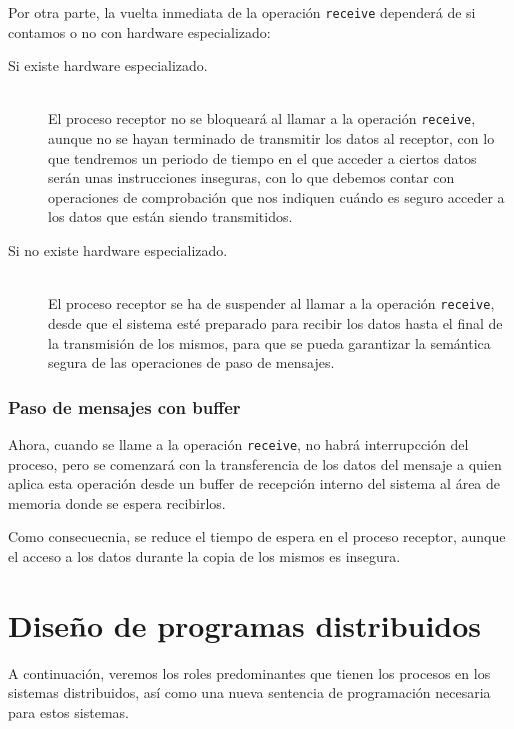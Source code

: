 Por otra parte, la vuelta inmediata de la operación \verb|receive| dependerá de si contamos o no con hardware especializado:
\begin{description}
    \item [Si existe hardware especializado.]~\\
        El proceso receptor no se bloqueará al llamar a la operación \verb|receive|, aunque no se hayan terminado de transmitir los datos al receptor, con lo que tendremos un periodo de tiempo en el que acceder a ciertos datos serán unas instrucciones inseguras, con lo que debemos contar con operaciones de comprobación que nos indiquen cuándo es seguro acceder a los datos que están siendo transmitidos.
    \item [Si no existe hardware especializado.]~\\
        El proceso receptor se ha de suspender al llamar a la operación \verb|receive|, desde que el sistema esté preparado para recibir los datos hasta el final de la transmisión de los mismos, para que se pueda garantizar la semántica segura de las operaciones de paso de mensajes.
\end{description}

\subsubsection{Paso de mensajes con buffer}
Ahora, cuando se llame a la operación \verb|receive|, no habrá interrupcción del proceso, pero se comenzará con la transferencia de los datos del mensaje a quien aplica esta operación desde un buffer de recepción interno del sistema al área de memoria donde se espera recibirlos.

Como consecuecnia, se reduce el tiempo de espera en el proceso receptor, aunque el acceso a los datos durante la copia de los mismos es insegura.

\section{Diseño de programas distribuidos}
A continuación, veremos los roles predominantes que tienen los procesos en los sistemas distribuidos, así como una nueva sentencia de programación necesaria para estos sistemas.

